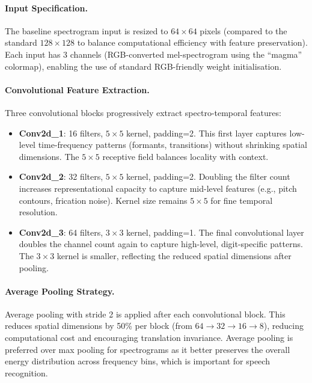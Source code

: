 \paragraph{Input Specification.}
The baseline spectrogram input is resized to $64\times64$ pixels (compared to the standard $128\times128$ to balance computational efficiency with feature preservation). Each input has 3 channels (RGB-converted mel-spectrogram using the ``magma'' colormap), enabling the use of standard RGB-friendly weight initialisation.

\paragraph{Convolutional Feature Extraction.}
Three convolutional blocks progressively extract spectro-temporal features:
\begin{itemize}
    \item \textbf{Conv2d\_1}: 16 filters, $5\times5$ kernel, padding=2. This first layer captures low-level time-frequency patterns (formants, transitions) without shrinking spatial dimensions. The $5\times5$ receptive field balances locality with context.
    \item \textbf{Conv2d\_2}: 32 filters, $5\times5$ kernel, padding=2. Doubling the filter count increases representational capacity to capture mid-level features (e.g., pitch contours, frication noise). Kernel size remains $5\times5$ for fine temporal resolution.
    \item \textbf{Conv2d\_3}: 64 filters, $3\times3$ kernel, padding=1. The final convolutional layer doubles the channel count again to capture high-level, digit-specific patterns. The $3\times3$ kernel is smaller, reflecting the reduced spatial dimensions after pooling.
\end{itemize}

\paragraph{Average Pooling Strategy.}
Average pooling with stride 2 is applied after each convolutional block. This reduces spatial dimensions by 50\% per block (from $64\to32\to16\to8$), reducing computational cost and encouraging translation invariance. Average pooling is preferred over max pooling for spectrograms as it better preserves the overall energy distribution across frequency bins, which is important for speech recognition.

